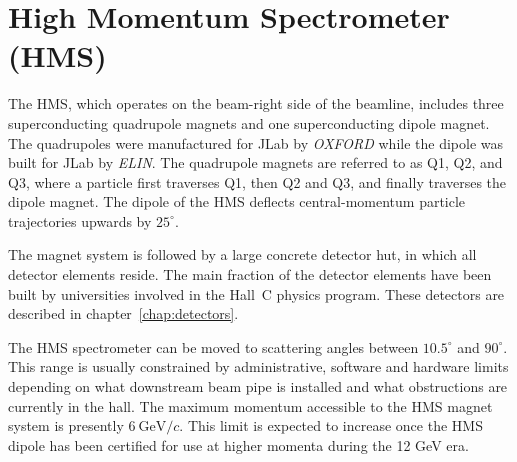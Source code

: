 \section{High Momentum Spectrometer (HMS) }

The HMS, which operates on the beam-right side of the beamline,
includes three superconducting quadrupole magnets and one superconducting dipole magnet. The quadrupoles were
manufactured for JLab by {\em OXFORD} while the dipole was built for
JLab by {\em ELIN}.  The quadrupole magnets are referred to as Q1, Q2,
and Q3, where a particle first traverses Q1, then Q2 and Q3, and
finally traverses the dipole magnet. The dipole of the HMS deflects central-momentum
particle trajectories upwards by $25^{\circ}$.


The magnet system is followed by a large concrete detector hut, in which all
detector elements reside. The main fraction of the detector elements have been
built by universities involved in the Hall~C physics program.  These
detectors are described in chapter~\ref{chap:detectors}.

The HMS spectrometer can be moved to scattering angles between
$10.5^{\circ}$ and $90^{\circ}$. This range is usually constrained by
administrative, software and hardware limits depending on what
downstream beam pipe is installed and what obstructions are currently in the hall.  The
maximum momentum accessible to the HMS magnet
system is presently $6~\textrm{GeV}/c$. This limit is expected to increase
once the HMS dipole has been certified for use at higher momenta during
the 12 GeV era.

